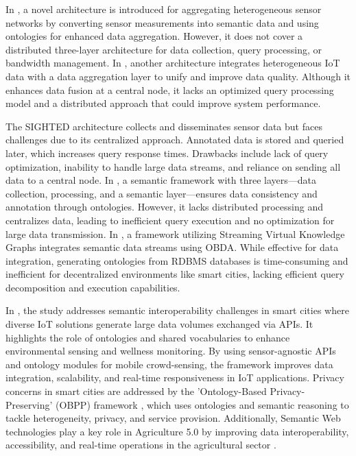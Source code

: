 \documentclass[5p,times]{elsarticle}
\begin{document}
In \cite{inproceedings33}, a novel architecture is introduced for aggregating heterogeneous sensor networks
 by converting sensor measurements into semantic data and using ontologies for 
 enhanced data aggregation. However, it does not cover a distributed three-layer 
 architecture for data collection, query processing, or bandwidth management.
  In \cite{Wang2017}, another architecture integrates heterogeneous IoT data with a
   data aggregation layer to unify and improve data quality. Although it enhances 
   data fusion at a central node, it lacks an optimized query processing model and 
   a distributed approach that could improve system performance.


The SIGHTED architecture \cite{article35} collects and disseminates sensor data but faces challenges due to its
 centralized approach. Annotated data is stored and queried later, which increases query response times. 
 Drawbacks include lack of query optimization, inability to handle large data streams, 
 and reliance on sending all data to a central node. In \cite{Zafeiropoulos2008},
  a semantic framework with three layers—data collection, processing, and a semantic 
  layer—ensures data consistency and annotation through ontologies. However, it lacks
   distributed processing and centralizes data, leading to inefficient query execution
    and no optimization for large data transmission. In \cite{belcao2020streaming}, 
    a framework utilizing Streaming Virtual Knowledge Graphs integrates semantic data 
    streams using OBDA. While effective for data integration, generating ontologies from
     RDBMS databases is time-consuming and inefficient for decentralized environments 
     like smart cities, lacking efficient query decomposition and execution capabilities.



In \cite{zappatore2023semantic}, the study addresses semantic interoperability challenges
 in smart cities where diverse IoT solutions generate large data volumes exchanged via APIs. 
 It highlights the role of ontologies and shared vocabularies to enhance environmental sensing 
 and wellness monitoring. By using sensor-agnostic APIs and ontology modules for mobile crowd-sensing,
  the framework improves data integration, scalability, and real-time responsiveness in IoT applications.
   Privacy concerns in smart cities are addressed by the 'Ontology-Based Privacy-Preserving' (OBPP) framework \cite{GHEISARI20211},
    which uses ontologies and semantic reasoning to tackle heterogeneity, privacy, and service provision.
     Additionally, Semantic Web technologies play a key role in Agriculture 5.0 by improving data interoperability, 
     accessibility, and real-time operations in the agricultural sector \cite{de2023spatio}.    
\end{document}
